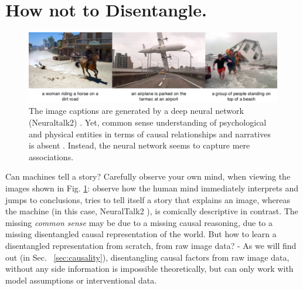 \section{How not to Disentangle.}
	\begin{figure}[htp]
		\centering
		\includegraphics[trim={0cm 0cm 0cm 0cm},clip, width=1.\linewidth]{fig/other/notcausal}
		\caption{The image captions are generated by a deep neural network (Neuraltalk2) \cite{karpathy15neuraltalk}. Yet, common sense understanding of psychological and physical entities in terms of causal relationships and narratives is absent \cite{tenenbaum18think}. Instead, the neural network seems to capture mere associations.}
		\label{fig:notcausal}
	\end{figure}
	Can machines tell a story? Carefully observe your own mind, when viewing the images shown in Fig. \ref{fig:notcausal}: observe how the human mind immediately interprets and jumps to conclusions, tries to tell itself a story that explains an image, whereas the machine (in this case, NeuralTalk2 \cite{karpathy15neuraltalk}), is comically descriptive in contrast.
	The missing \textit{common sense} may be due to a missing causal reasoning, due to a missing disentangled causal representation of the world.
	But how to learn a disentangled representation from scratch, \ie from raw image data? -
	As we will find out (in Sec. ~\ref{sec:causality}), disentangling causal factors from raw image data, without any side information is impossible theoretically, but can only work with model assumptions or interventional data.

